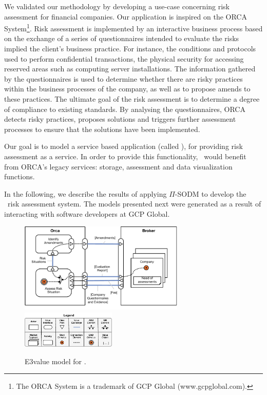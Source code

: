 We validated our methodology by developing a use-case concerning risk assessment for financial companies.
Our application is inspired on the ORCA System\footnote{The ORCA System is a trademark of GCP Global (www.gcpglobal.com).}.
Risk assessment is implemented by an interactive business process based on the exchange of a series of questionnaires intended to evaluate the risks implied the client's business practice.
For instance, the conditions and protocols used to perform confidential transactions, the physical security for accessing reserved areas such as computing server installations.
The information gathered by the questionnaires is used to determine whether there are risky practices within the business processes of the company, as well as to propose amends to these practices.
The ultimate goal of the risk assessment is to determine a degree of compliance to existing standards.
By analysing the questionnaires, ORCA detects risky practices, proposes solutions and triggers further assessment processes to ensure that the solutions have been implemented.

Our goal is to model a service based application (called \FlyingPig), for providing risk assessment as a service.
In order to provide this functionality, \FlyingPig\ would benefit from ORCA's legacy services: storage, assessment and data visualization functions.

In the following, we describe the results of applying $\Pi$-SODM to develop the \FlyingPig\ risk assessment system.
The models presented next were generated as a result of interacting with software developers at GCP Global.

\begin{figure}
\centering
\includegraphics[width=0.7\textwidth]{figs/3ValueModel.pdf}
\hspace*{5cm}\includegraphics[width=0.4\textwidth]{figs/3ValueKey.pdf}
\caption{E3value model for \FlyingPig.\label{fig:E3valuemodel}}
\end{figure}



